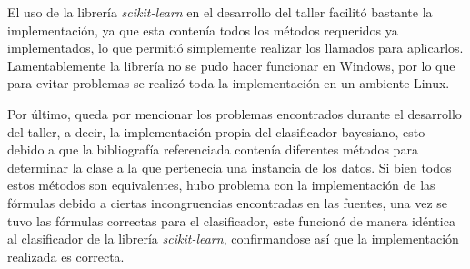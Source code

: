 \documentclass[letter, titlepage, 10pt]{article}
\begin{document}
El uso de la librería \textit{scikit-learn} en el desarrollo del taller facilitó bastante la implementación, ya que esta contenía todos los métodos requeridos ya implementados, lo que permitió simplemente realizar los llamados para aplicarlos. Lamentablemente la librería no se pudo hacer funcionar en Windows, por lo que para evitar problemas se realizó toda la implementación en un ambiente Linux.

Por último, queda por mencionar los problemas encontrados durante el desarrollo del taller, a decir, la implementación propia del clasificador bayesiano, esto debido a que la bibliografía referenciada contenía diferentes métodos para determinar la clase a la que pertenecía una instancia de los datos. Si bien todos estos métodos son equivalentes, hubo problema con la implementación de las fórmulas debido a ciertas incongruencias encontradas en las fuentes, una vez se tuvo las fórmulas correctas para el clasificador, este funcionó de manera idéntica al clasificador de la librería \textit{scikit-learn}, confirmandose así que la implementación realizada es correcta.


\newpage


\end{document}
